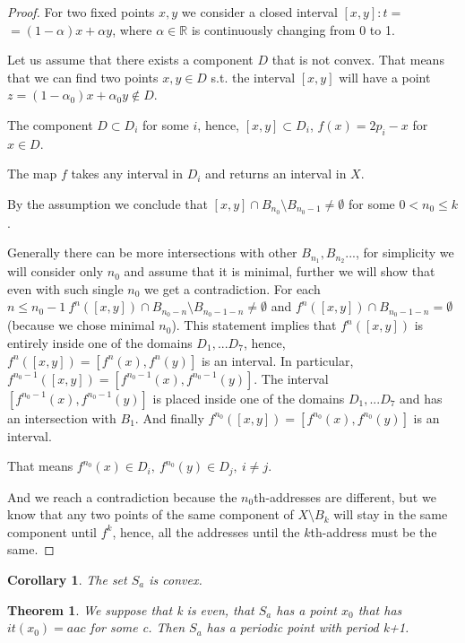 \documentclass[a4paper, 12pt]{article}
\newtheorem{theorem}{Theorem}
\newtheorem{cor}{Corollary}
\begin{document}
\begin{proof}
For two fixed points $x,y$ we consider a closed interval $[x,y]:t=$\newline
$=(1-\alpha)x+\alpha y$, where $\alpha\in\mathbb{R}$ is continuously changing from 0 to 1.

Let us assume that there exists a component $D$ that is not convex.
That means that we can find two points $x,y\in D$ s.t. the interval $[x,y]$ will have a point $z=(1-\alpha_0)x+\alpha_0 y\not \in D$.

The component $D\subset D_i$ for some $i$, hence, $[x,y]\subset D_i$, $f(x)=2p_i-x$ for $x\in D$.

The map $f$ takes any interval in $D_i$ and returns an interval in $X$.

By the assumption we conclude that $[x,y]\cap B_{n_0}\setminus B_{n_0-1}\neq \emptyset$ for some $0<n_0\leq k$.

Generally there can be more intersections with other $B_{n_1},B_{n_2}...$, for simplicity we will consider only $n_0$ and assume that it is minimal, further we will show that even with such single $n_0$ we get a contradiction. For each $n\leq n_0-1\ f^n([x,y])\cap B_{n_0-n}\setminus B_{n_0-1-n}\neq \emptyset$ and $f^n([x,y])\cap B_{n_0-1-n}=\emptyset$ (because we chose minimal $n_0$). This statement implies that $f^n([x,y])$ is entirely inside one of the domains $D_1,...D_7$, hence,  $f^n([x,y])=[f^n(x),f^n(y)]$ is an interval. In particular, $f^{n_0-1}([x,y])=[f^{n_0-1}(x),f^{n_0-1}(y)]$. The interval $[f^{n_0-1}(x),f^{n_0-1}(y)]$ is placed inside one of the domains $D_1,...D_7$ and has an intersection with $B_1$. And finally $f^{n_0}([x,y])=[f^{n_0}(x),f^{n_0}(y)]$ is an interval.

That means $f^{n_0}(x)\in D_i,\ f^{n_0}(y)\in D_j,\ i\neq j$.

And we reach a contradiction because the $n_0$th-addresses are different, but we know that any two points of the same component of $X\setminus B_k$ will stay in the same component until $f^k$, hence, all the addresses until the $k$th-address must be the same.\newline
\end{proof}
\begin{cor} The set $S_a$ is convex.
\end{cor}
\begin{theorem} We suppose that k is even, that $S_a$ has a point $x_0$ that has $it(x_0)=aac$ for some c. Then $S_a$ has a periodic point with period k+1.
\end{theorem}
\end{document}
